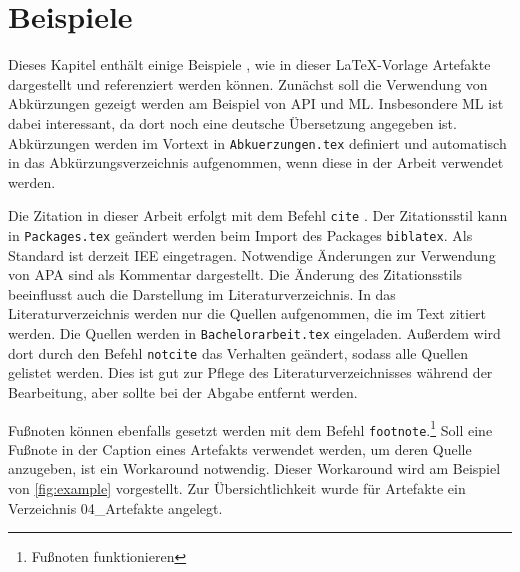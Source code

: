 %
%
\chapter{Beispiele}

Dieses Kapitel enthält einige Beispiele , wie in dieser \LaTeX-Vorlage Artefakte dargestellt und referenziert werden können.
Zunächst soll die Verwendung von Abkürzungen gezeigt werden am Beispiel von \ac{API} und \ac{ML}.
Insbesondere \ac{ML} ist dabei interessant, da dort noch eine deutsche Übersetzung angegeben ist. Abkürzungen werden im Vortext in \texttt{Abkuerzungen.tex} definiert und automatisch in das Abkürzungsverzeichnis aufgenommen, wenn diese in der Arbeit verwendet werden.

Die Zitation in dieser Arbeit erfolgt mit dem Befehl \texttt{cite} \cite[S. 0]{ertelIntroductionArtificialIntelligence2017}.
Der Zitationsstil kann in \texttt{Packages.tex} geändert werden beim Import des Packages \texttt{biblatex}.
Als Standard ist derzeit IEE eingetragen. 
Notwendige Änderungen zur Verwendung von APA sind als Kommentar dargestellt.
Die Änderung des Zitationsstils beeinflusst auch die Darstellung im Literaturverzeichnis.
In das Literaturverzeichnis werden nur die Quellen aufgenommen, die im Text zitiert werden.
Die Quellen werden in \texttt{Bachelorarbeit.tex} eingeladen.
Außerdem wird dort durch den Befehl \texttt{notcite} das Verhalten geändert, sodass alle Quellen gelistet werden.
Dies ist gut zur Pflege des Literaturverzeichnisses während der Bearbeitung, aber sollte bei der Abgabe entfernt werden.

Fußnoten können ebenfalls gesetzt werden mit dem Befehl \texttt{footnote}.\footnote{Fußnoten funktionieren}
Soll eine Fußnote in der Caption eines Artefakts verwendet werden, um deren Quelle anzugeben, ist ein Workaround notwendig.
Dieser Workaround wird am Beispiel von \cref{fig:example} vorgestellt. Zur Übersichtlichkeit wurde für Artefakte ein Verzeichnis 04\_Artefakte angelegt.

